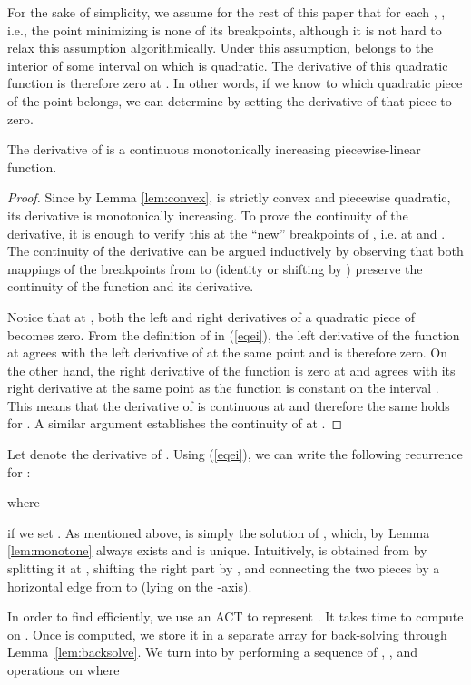 \documentclass[11pt]{article}
\begin{document}
For the sake of simplicity, we assume for the rest of this paper that 
for each , , i.e., the point minimizing 
 is none of its breakpoints, although it is not hard to 
relax this assumption algorithmically. 
Under this assumption,  belongs to the interior of some interval on which  is quadratic. The derivative of this quadratic function is therefore zero at . In other words, if we know to which quadratic piece of  the point  belongs, we can determine  by setting the derivative of that piece to zero. 

\begin{lemma}\label{lem:monotone}
The derivative of  is a continuous monotonically increasing piecewise-linear function. 
\end{lemma}
\begin{proof}Since by Lemma \ref{lem:convex},  is strictly convex and piecewise quadratic, its derivative  is monotonically increasing. To prove the continuity of the derivative, it is enough to verify this at the ``new'' breakpoints of , i.e. at  and . The continuity of the derivative can be argued inductively by observing that both mappings of the breakpoints from  to  (identity or shifting by ) preserve the continuity of the function and its derivative. 

Notice that at , both the left and right derivatives of a quadratic piece of  becomes zero. From the definition of  in (\ref{eqei}), the left derivative of the function  at  agrees with the left derivative of  at the same point and is therefore zero. On the other hand, the right derivative of the function  is zero at  and agrees with its  right derivative at the same point as the function is constant on the interval . This means that the derivative of  is continuous at  and therefore the same holds for . A similar argument establishes the continuity of  at .
\end{proof} 

Let  denote the derivative of .
Using (\ref{eqei}), we can write the following recurrence for :

where 

if we set . As mentioned above,  is simply the solution of , which, by Lemma \ref{lem:monotone} always exists and is unique. 
Intuitively,  is obtained from  by splitting it at , shifting the right part by , and connecting the two pieces by a horizontal edge from  to  (lying on the -axis).  




In order to find  efficiently, we use an ACT  to represent .  It takes  time to compute  on .  
Once  is computed, we store it in a separate array for back-solving through Lemma~\ref{lem:backsolve}.  
We turn  into  by performing a sequence of
, , and  operations on  where 
\end{document}
